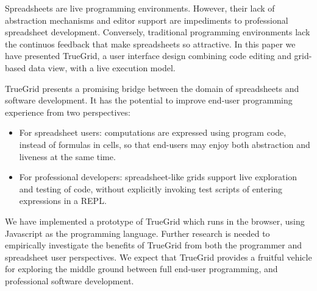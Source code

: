 \documentclass{llncs}
\begin{document}
Spreadsheets are live programming environments. However, their lack of abstraction mechanisms and editor support are impediments to professional spreadsheet development. Conversely, traditional programming environments lack the continuos feedback that make spreadsheets so attractive. In this paper we have presented TrueGrid, a user interface design combining code editing and grid-based data view, with a live execution model.

TrueGrid presents a promising bridge between the domain of spreadsheets and software development. It has the potential to improve end-user programming experience from two perspectives:
\begin{itemize}
\item For spreadsheet users: computations are expressed using program code, instead of  formulas in cells, so that end-users may enjoy both abstraction and liveness at the same time.
\item For professional developers: spreadsheet-like grids support live exploration and testing of code, without explicitly invoking test scripts of entering expressions in a REPL.
\end{itemize}
We have implemented a prototype of TrueGrid which runs in the browser, using Javascript as the programming language. Further research is needed to empirically investigate the benefits of TrueGrid from both the programmer and spreadsheet user perspectives. 
We expect that TrueGrid provides a fruitful vehicle for exploring the middle ground between full end-user programming, and professional software development. 




\end{document}
